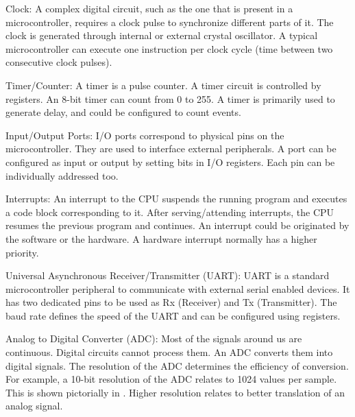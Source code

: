\begin{description}
  \item {Clock:} A complex digital circuit, such as the one that is
        present in a microcontroller, requires a clock pulse to
        synchronize different parts of it.  The clock
        is generated through internal or external crystal oscillator. A
        typical microcontroller can execute one instruction per clock
        cycle (time between two consecutive clock pulses).

  \item {Timer/Counter:} A timer is a pulse counter. A timer circuit is
        controlled by registers. An 8-bit timer can count from 0 to 255. A
        timer is primarily used to generate delay, and could be configured
        to count events.

  \item{Input/Output Ports:} I/O ports correspond to physical pins on
        the microcontroller. They are used to interface external peripherals. A
        port can be configured as input or output by setting bits in I/O
        registers. Each pin can be individually addressed too.

  \item{Interrupts:} An interrupt to the CPU suspends the running program
        and executes a code block corresponding to it. After serving/attending
        interrupts, the CPU resumes the previous program and continues. An
        interrupt could be originated by the software or the hardware. A
        hardware interrupt normally has a higher priority.

  \item {Universal Asynchronous Receiver/Transmitter (UART):} UART is a
        standard microcontroller peripheral to communicate with external
        serial enabled devices. It has two dedicated pins to be used as
        Rx (Receiver) and Tx (Transmitter).  The baud rate defines the speed
        of the UART and can be configured using registers.

  \item {Analog to Digital Converter (ADC):} Most of the signals around
        us are continuous. Digital circuits cannot process them. An ADC
        converts them into digital signals. The resolution of the ADC
        determines the efficiency of conversion. For example, a 10-bit
        resolution of the ADC relates to 1024 values per sample. This is
        shown pictorially in . Higher resolution relates
        to better translation of an analog signal.


\end{description}
